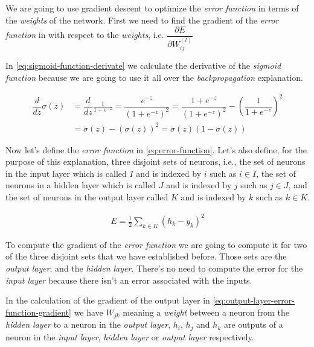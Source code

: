 We are going to use gradient descent to optimize the \textit{error
function} in terms of the \textit{weights} of the network. First we
need to find the gradient of the \textit{error function} in with
respect to the \textit{weights}, i.e. $\dfrac{\partial E}{\partial
  W_{ij}^{(l)}}$

In \autoref{eq:sigmoid-function-derivate} we calculate the derivative
of the \textit{sigmoid function} because we are going to use it all
over the \textit{backpropagation} explanation.

\begin{equation}
  \begin{aligned}
    \label{eq:sigmoid-function-derivate}
    \dfrac{d}{dz} \sigma(z) & = \dfrac{d}{dz} \frac{1}{1 + e^{-z}} =
    \dfrac{e^{-z}}{(1 + e^{-z})^2} = \dfrac{1 + e^{-z}}{(1 +
      e^{-z})^2} - \left( \dfrac{1}{1 + e^{-z}} \right)^2 \\
    & = \sigma(z) - (\sigma(z))^2 = \sigma(z)(1-\sigma(z))
  \end{aligned}
\end{equation}

Now let's define the \textit{error function} in
\autoref{eq:error-function}. Let's also define, for the purpose of
this explanation, three disjoint sets of neurons, i.e., the set of
neurons in the input layer which is called $I$ and is indexed by $i$
such as $ i \in I$, the set of neurons in a hidden layer which is
called $J$ and is indexed by $j$ such as $j \in J$, and the set of
neurons in the output layer called $K$ and is indexed by $k$ such as
$k \in K$.

\begin{equation}
  \begin{aligned}
    \label{eq:error-function}
    E = \frac{1}{2} \sum_{k \in K} (h_k - y_k)^2
  \end{aligned}
\end{equation}

To compute the gradient of the \textit{error function} we are going to
compute it for two of the three disjoint sets that we have established
before. Those sets are the \textit{output layer}, and the
\textit{hidden layer}. There's no need to compute the error for the
\textit{input layer} because there isn't an error associated with the
inputs.

In the calculation of the gradient of the output layer in
\autoref{eq:output-layer-error-function-gradient} we have $W_{jk}$
meaning a \textit{weight} between a neuron from the \textit{hidden
layer} to a neuron in the \textit{output layer}, $h_i$, $h_j$ and
$h_k$ are outputs of a neuron in the \textit{input layer},
\textit{hidden layer} or \textit{output layer} respectively.

